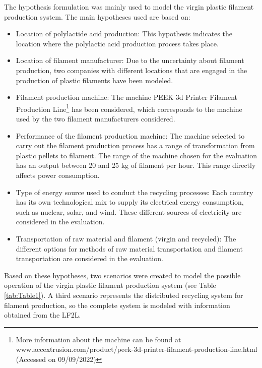\documentclass[12pt]{elsarticle} %
\begin{document}
The hypothesis formulation was mainly used to model the virgin plastic filament production system. The main hypotheses used are based on:

\begin{itemize}
\item
  Location of polylactide acid production: This hypothesis indicates the location where the polylactic acid production process takes place.
\item
  Location of filament manufacturer: Due to the uncertainty about filament production, two companies with different locations that are engaged in the production of plastic filaments have been modeled.
\item
  Filament production machine: The machine PEEK 3d Printer Filament Production Line\footnote{More information about the machine can be found at www.accextrusion.com/product/peek-3d-printer-filament-production-line.html (Accessed on 09/09/2022)} has been considered, which corresponds to the machine used by the two filament manufacturers considered.
\item
  Performance of the filament production machine: The machine selected to carry out the filament production process has a range of transformation from plastic pellets to filament. The range of the machine chosen for the evaluation has an output between 20 and 25 kg of filament per hour. This range directly affects power consumption.
\item
  Type of energy source used to conduct the recycling processes: Each country has its own technological mix to supply its electrical energy consumption, such as nuclear, solar, and wind. These different sources of electricity are considered in the evaluation.
\item
  Transportation of raw material and filament (virgin and recycled): The different options for methods of raw material transportation and filament transportation are considered in the evaluation.
\end{itemize}

Based on these hypotheses, two scenarios were created to model the possible operation of the virgin plastic filament production system (see Table \ref{tab:Table1}).
A third scenario represents the distributed recycling system for filament production, so the complete system is modeled with information obtained from the LF2L.
\end{document}
